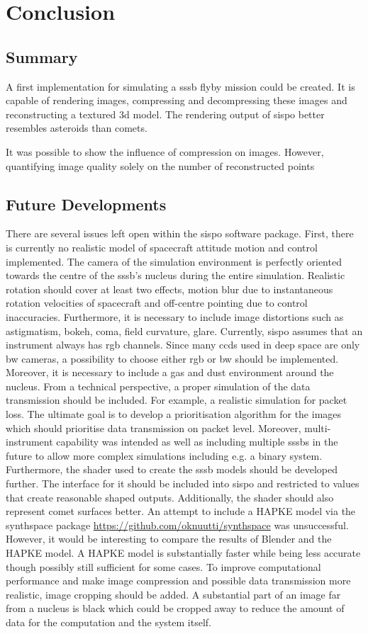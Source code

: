 \section{Conclusion} \label{sec:conclusion}
\subsection{Summary}
A first implementation for simulating a \gls{sssb} flyby mission could be created. It is capable of rendering images, compressing and decompressing these images and reconstructing a textured \gls{3d} model.
The rendering output of \gls{sispo} better resembles asteroids than comets.

It was possible to show the influence of compression on images. However, quantifying image quality solely on the number of reconstructed points

\subsection{Future Developments}
There are several issues left open within the \gls{sispo} software package. First, there is currently no realistic model of spacecraft attitude motion and control implemented. The camera of the simulation environment is perfectly oriented towards the centre of the \gls{sssb}'s nucleus during the entire simulation. Realistic rotation should cover at least two effects, motion blur due to instantaneous rotation velocities of spacecraft and off-centre pointing due to control inaccuracies. Furthermore, it is necessary to include  image distortions such as astigmatism, bokeh, coma, field curvature, glare.
Currently, \gls{sispo} assumes that an instrument always has \gls{rgb} channels. Since many \gls{ccd}s used in deep space are only \gls{bw} cameras, a possibility to choose either \gls{rgb} or \gls{bw} should be implemented.
Moreover, it is necessary to include a gas and dust environment around the nucleus. From a technical perspective, a proper simulation of the data transmission should be included. For example, a realistic simulation for packet loss. The ultimate goal is to develop a prioritisation algorithm for the images which should prioritise data transmission on packet level.
Moreover, multi-instrument capability was intended as well as including multiple \gls{sssb}s in the future to allow more complex simulations including e.g. a binary system.
Furthermore, the shader used to create the \gls{sssb} models should be developed further. The interface for it should be included into \gls{sispo} and restricted to values that create reasonable shaped outputs. Additionally, the shader should also represent comet surfaces better.
An attempt to include a HAPKE model via the synthspace package \url{https://github.com/oknuutti/synthspace} was unsuccessful. However, it would be interesting to compare the results of Blender and the HAPKE model. A HAPKE model is substantially faster while being less accurate though possibly still sufficient for some cases.
To improve computational performance and make image compression and possible data transmission more realistic, image cropping should be added. A substantial part of an image far from a nucleus is black which could be cropped away to reduce the amount of data for the computation and the system itself.